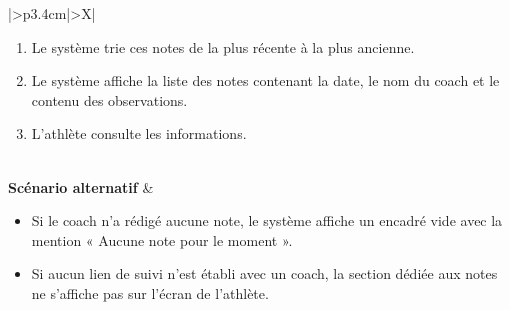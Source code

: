 \documentclass[a4paper,12pt]{report}
\begin{document}
\begin{table}[H]
\begin{tabularx}{\textwidth}{|>{\RaggedRight\arraybackslash}p{3.4cm}|>{\RaggedRight\arraybackslash}X|}
\begin{minipage}[t]{\linewidth}
\begin{enumerate}[label=\arabic*., leftmargin=*, topsep=0pt, itemsep=1pt]
    \item Le système trie ces notes de la plus récente à la plus ancienne.
    \item Le système affiche la liste des notes contenant la date, le nom du coach et le contenu des observations.
    \item L'athlète consulte les informations.
\end{enumerate}
\vspace{2pt}
\end{minipage} \\
\hline
\textbf{Scénario alternatif} &
\begin{minipage}[t]{\linewidth}\sloppy
\vspace{2pt}
\begin{itemize}[leftmargin=*, topsep=0pt, itemsep=1pt]
    \item  Si le coach n'a rédigé aucune note, le système affiche un encadré vide avec la mention « Aucune note pour le moment ».
    \item  Si aucun lien de suivi n'est établi avec un coach, la section dédiée aux notes ne s'affiche pas sur l'écran de l'athlète.
\end{itemize}
\vspace{2pt}
\end{minipage} \\
\hline
\end{tabularx}
\fussy
\end{table}
\endgroup
\end{document}
